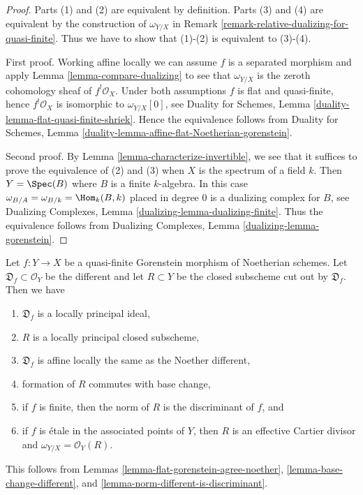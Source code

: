 \begin{proof}
Parts (1) and (2) are equivalent by definition. Parts (3) and (4)
are equivalent by the construction of $\omega_{Y/X}$ in
Remark \ref{remark-relative-dualizing-for-quasi-finite}.
Thus we have to show that (1)-(2) is equivalent to (3)-(4).

\medskip\noindent
First proof. Working affine locally we can assume $f$ is a separated
morphism and apply Lemma \ref{lemma-compare-dualizing} to see that
$\omega_{Y/X}$ is the zeroth cohomology sheaf of $f^!\mathcal{O}_X$.
Under both assumptions $f$ is flat and quasi-finite, hence
$f^!\mathcal{O}_X$ is isomorphic to $\omega_{Y/X}[0]$, see
Duality for Schemes, Lemma \ref{duality-lemma-flat-quasi-finite-shriek}. Hence
the equivalence follows from
Duality for Schemes, Lemma
\ref{duality-lemma-affine-flat-Noetherian-gorenstein}.

\medskip\noindent
Second proof. By Lemma \ref{lemma-characterize-invertible},
we see that it suffices to prove the equivalence of
(2) and (3) when $X$ is the spectrum of a field $k$.
Then $Y = \Spec(B)$ where $B$ is a finite $k$-algebra.
In this case $\omega_{B/A} = \omega_{B/k} = \Hom_k(B, k)$
placed in degree $0$ is a dualizing complex for $B$, see
Dualizing Complexes, Lemma \ref{dualizing-lemma-dualizing-finite}.
Thus the equivalence follows from
Dualizing Complexes, Lemma \ref{dualizing-lemma-gorenstein}.
\end{proof}

\begin{remark}
\label{remark-collect-results-qf-gorenstein}
Let $f : Y \to X$ be a quasi-finite Gorenstein morphism of Noetherian schemes.
Let $\mathfrak D_f \subset \mathcal{O}_Y$ be the different and let
$R \subset Y$ be the closed subscheme cut out by $\mathfrak D_f$.
Then we have
\begin{enumerate}
\item $\mathfrak D_f$ is a locally principal ideal,
\item $R$ is a locally principal closed subscheme,
\item $\mathfrak D_f$ is affine locally the same as the Noether different,
\item formation of $R$ commutes with base change,
\item if $f$ is finite, then the norm of $R$ is the discriminant of $f$, and
\item if $f$ is \'etale in the associated points of $Y$, then
$R$ is an effective Cartier divisor and $\omega_{Y/X} = \mathcal{O}_Y(R)$.
\end{enumerate}
This follows from Lemmas \ref{lemma-flat-gorenstein-agree-noether},
\ref{lemma-base-change-different}, and
\ref{lemma-norm-different-is-discriminant}.
\end{remark}

